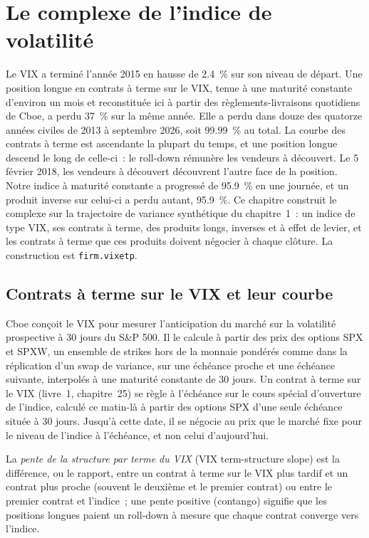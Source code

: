 \chapter{Le complexe de l'indice de volatilité}\label{ch:s2:the-volatility-index-complex}

Le VIX a terminé l'année 2015 en hausse de 2.4~\% sur son niveau de départ. Une position longue en contrats à terme sur le VIX, tenue à une maturité constante d'environ un mois et reconstituée ici à partir
des règlements-livraisons quotidiens de Cboe, a perdu 37~\% sur la même année. Elle a perdu dans douze des quatorze années civiles de 2013 à septembre 2026, soit 99.99~\% au total. La courbe des contrats à terme
est ascendante la plupart du temps, et une position longue descend le long de celle-ci~: le roll-down rémunère les vendeurs à découvert. Le 5 février 2018, les vendeurs à découvert
découvrent l'autre face de la position. Notre indice à maturité constante a progressé de 95.9~\% en une journée, et un produit inverse sur celui-ci a perdu autant, 95.9~\%. Ce chapitre
construit le complexe sur la trajectoire de variance synthétique du chapitre~1~: un indice de type VIX, ses contrats à terme, des produits longs, inverses et à effet de levier, et les contrats à terme
que ces produits doivent négocier à chaque clôture. La construction est \texttt{firm.vixetp}.

\section{Contrats à terme sur le VIX et leur courbe}

Cboe conçoit le VIX pour mesurer l'anticipation du marché sur la volatilité prospective à 30 jours du S\&P 500. Il le calcule à partir des prix des options SPX et
SPXW, un ensemble de strikes hors de la monnaie pondérés comme dans la réplication d'un swap de variance, sur une échéance proche et une échéance suivante, interpolés à une
maturité constante de 30 jours. Un contrat à terme sur le VIX (livre~1, chapitre~25) se règle à l'échéance sur le cours spécial d'ouverture de l'indice, calculé ce matin-là à partir
des options SPX d'une seule échéance située à 30 jours. Jusqu'à cette date, il se négocie au prix que le marché fixe pour
le niveau de l'indice à l'échéance, et non celui d'aujourd'hui.

\begin{definition}\label{def:s2:the-volatility-index-complex:slope}
La \emph{pente de la structure par terme du VIX} (VIX term-structure slope) est la différence, ou le rapport, entre un contrat à terme sur le VIX plus tardif et un contrat plus proche (souvent le
deuxième et le premier contrat) ou entre le premier contrat et l'indice~; une pente positive (contango) signifie que les positions longues paient un roll-down à mesure que
chaque contrat converge vers l'indice.
\end{definition}

